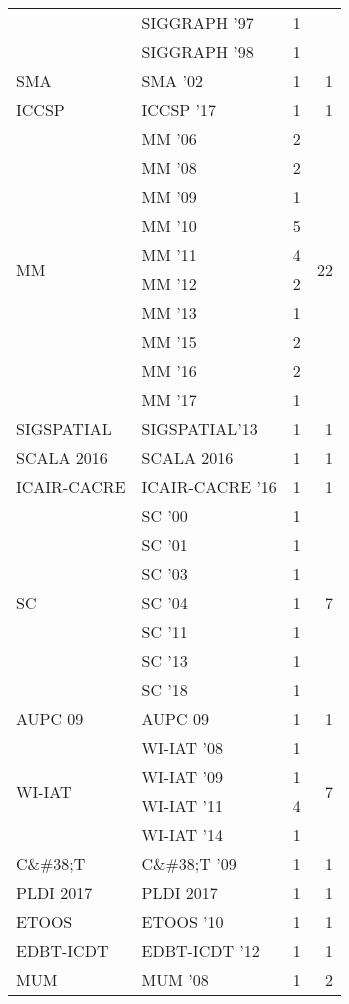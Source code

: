 \begin{table*}[t]
\begin{tabular}{llrr}
& SIGGRAPH '97 & 1 &\\
& SIGGRAPH '98 & 1 &\\
\multirow{1}{*}{SMA } & SMA '02 & 1 & \multirow{1}{*}{1}\\
\multirow{1}{*}{ICCSP } & ICCSP '17 & 1 & \multirow{1}{*}{1}\\
\multirow{10}{*}{MM } & MM '06 & 2 & \multirow{10}{*}{22}\\
& MM '08 & 2 &\\
& MM '09 & 1 &\\
& MM '10 & 5 &\\
& MM '11 & 4 &\\
& MM '12 & 2 &\\
& MM '13 & 1 &\\
& MM '15 & 2 &\\
& MM '16 & 2 &\\
& MM '17 & 1 &\\
\multirow{1}{*}{SIGSPATIAL} & SIGSPATIAL'13 & 1 & \multirow{1}{*}{1}\\
\multirow{1}{*}{SCALA 2016} & SCALA 2016 & 1 & \multirow{1}{*}{1}\\
\multirow{1}{*}{ICAIR-CACRE } & ICAIR-CACRE '16 & 1 & \multirow{1}{*}{1}\\
\multirow{7}{*}{SC } & SC '00 & 1 & \multirow{7}{*}{7}\\
& SC '01 & 1 &\\
& SC '03 & 1 &\\
& SC '04 & 1 &\\
& SC '11 & 1 &\\
& SC '13 & 1 &\\
& SC '18 & 1 &\\
\multirow{1}{*}{AUPC 09} & AUPC 09 & 1 & \multirow{1}{*}{1}\\
\multirow{4}{*}{WI-IAT } & WI-IAT '08 & 1 & \multirow{4}{*}{7}\\
& WI-IAT '09 & 1 &\\
& WI-IAT '11 & 4 &\\
& WI-IAT '14 & 1 &\\
\multirow{1}{*}{C\&\#38;T } & C\&\#38;T '09 & 1 & \multirow{1}{*}{1}\\
\multirow{1}{*}{PLDI 2017} & PLDI 2017 & 1 & \multirow{1}{*}{1}\\
\multirow{1}{*}{ETOOS } & ETOOS '10 & 1 & \multirow{1}{*}{1}\\
\multirow{1}{*}{EDBT-ICDT } & EDBT-ICDT '12 & 1 & \multirow{1}{*}{1}\\
\multirow{2}{*}{MUM } & MUM '08 & 1 & \multirow{2}{*}{2}\\

\end{tabular}
\end{table*}
